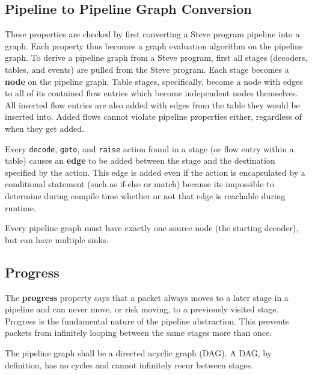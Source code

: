 \subsection{Pipeline to Pipeline Graph Conversion} \label{pipeline_graph}

These properties are checked by first converting a Steve program pipeline into a graph. Each property thus becomes a graph evaluation algorithm on the pipeline graph. To derive a pipeline graph from a Steve program, first all stages (decoders, tables, and events) are pulled from the Steve program. Each stage becomes a \textbf{node} on the pipeline graph. Table stages, specifically, become a node with edges to all of its contained flow entries which become independent nodes themselves. All inserted flow entries are also added with edges from the table they would be inserted into. Added flows cannot violate pipeline properties either, regardless of when they get added.

Every \texttt{decode}, \texttt{goto}, and \texttt{raise} action found in a stage (or flow entry within a table) causes an \textbf{edge} to be added between the stage and the destination specified by the action. This edge is added even if the action is encapsulated by a conditional statement (such as if-else or match) because its impossible to determine during compile time whether or not that edge is reachable during runtime.

Every pipeline graph must have exactly one source node (the starting decoder), but can have multiple sinks.

\subsection{Progress} \label{progress_guide}

The \textbf{progress} property says that a packet always moves to a later stage in a pipeline and can never move, or risk moving, to a previously visited stage. Progress is the fundamental nature of the pipeline abstraction. This prevents packets from infinitely looping between the same stages more than once.

The pipeline graph shall be a directed acyclic graph (DAG). A DAG, by definition, has no cycles and cannot infinitely recur between stages.

